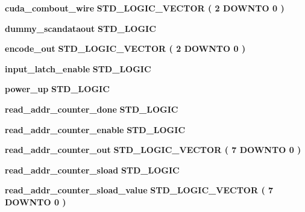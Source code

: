 \begin{DoxyCompactItemize}
\item 
{\bf cuda\+\_\+combout\+\_\+wire} {\bfseries \textcolor{comment}{S\+T\+D\+\_\+\+L\+O\+G\+I\+C\+\_\+\+V\+E\+C\+T\+OR}\textcolor{vhdlchar}{ }\textcolor{vhdlchar}{(}\textcolor{vhdlchar}{ }\textcolor{vhdlchar}{ } \textcolor{vhdldigit}{2} \textcolor{vhdlchar}{ }\textcolor{keywordflow}{D\+O\+W\+N\+TO}\textcolor{vhdlchar}{ }\textcolor{vhdlchar}{ } \textcolor{vhdldigit}{0} \textcolor{vhdlchar}{ }\textcolor{vhdlchar}{)}\textcolor{vhdlchar}{ }} 
\item 
{\bf dummy\+\_\+scandataout} {\bfseries \textcolor{comment}{S\+T\+D\+\_\+\+L\+O\+G\+IC}\textcolor{vhdlchar}{ }} 
\item 
{\bf encode\+\_\+out} {\bfseries \textcolor{comment}{S\+T\+D\+\_\+\+L\+O\+G\+I\+C\+\_\+\+V\+E\+C\+T\+OR}\textcolor{vhdlchar}{ }\textcolor{vhdlchar}{(}\textcolor{vhdlchar}{ }\textcolor{vhdlchar}{ } \textcolor{vhdldigit}{2} \textcolor{vhdlchar}{ }\textcolor{keywordflow}{D\+O\+W\+N\+TO}\textcolor{vhdlchar}{ }\textcolor{vhdlchar}{ } \textcolor{vhdldigit}{0} \textcolor{vhdlchar}{ }\textcolor{vhdlchar}{)}\textcolor{vhdlchar}{ }} 
\item 
{\bf input\+\_\+latch\+\_\+enable} {\bfseries \textcolor{comment}{S\+T\+D\+\_\+\+L\+O\+G\+IC}\textcolor{vhdlchar}{ }} 
\item 
{\bf power\+\_\+up} {\bfseries \textcolor{comment}{S\+T\+D\+\_\+\+L\+O\+G\+IC}\textcolor{vhdlchar}{ }} 
\item 
{\bf read\+\_\+addr\+\_\+counter\+\_\+done} {\bfseries \textcolor{comment}{S\+T\+D\+\_\+\+L\+O\+G\+IC}\textcolor{vhdlchar}{ }} 
\item 
{\bf read\+\_\+addr\+\_\+counter\+\_\+enable} {\bfseries \textcolor{comment}{S\+T\+D\+\_\+\+L\+O\+G\+IC}\textcolor{vhdlchar}{ }} 
\item 
{\bf read\+\_\+addr\+\_\+counter\+\_\+out} {\bfseries \textcolor{comment}{S\+T\+D\+\_\+\+L\+O\+G\+I\+C\+\_\+\+V\+E\+C\+T\+OR}\textcolor{vhdlchar}{ }\textcolor{vhdlchar}{(}\textcolor{vhdlchar}{ }\textcolor{vhdlchar}{ } \textcolor{vhdldigit}{7} \textcolor{vhdlchar}{ }\textcolor{keywordflow}{D\+O\+W\+N\+TO}\textcolor{vhdlchar}{ }\textcolor{vhdlchar}{ } \textcolor{vhdldigit}{0} \textcolor{vhdlchar}{ }\textcolor{vhdlchar}{)}\textcolor{vhdlchar}{ }} 
\item 
{\bf read\+\_\+addr\+\_\+counter\+\_\+sload} {\bfseries \textcolor{comment}{S\+T\+D\+\_\+\+L\+O\+G\+IC}\textcolor{vhdlchar}{ }} 
\item 
{\bf read\+\_\+addr\+\_\+counter\+\_\+sload\+\_\+value} {\bfseries \textcolor{comment}{S\+T\+D\+\_\+\+L\+O\+G\+I\+C\+\_\+\+V\+E\+C\+T\+OR}\textcolor{vhdlchar}{ }\textcolor{vhdlchar}{(}\textcolor{vhdlchar}{ }\textcolor{vhdlchar}{ } \textcolor{vhdldigit}{7} \textcolor{vhdlchar}{ }\textcolor{keywordflow}{D\+O\+W\+N\+TO}\textcolor{vhdlchar}{ }\textcolor{vhdlchar}{ } \textcolor{vhdldigit}{0} \textcolor{vhdlchar}{ }\textcolor{vhdlchar}{)}\textcolor{vhdlchar}{ }} 

\end{DoxyCompactItemize}
